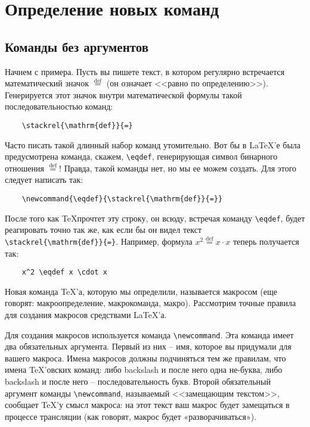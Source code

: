 \chapter{Определение новых команд}
\section{Команды без аргументов}

Начнем с примера. Пусть вы пишете текст, в котором регулярно встречается математический значок $\stackrel{\mathrm{def}}{=}$ (он означает <<равно по определению>>). Генерируется этот значок внутри математической формулы такой последовательностью команд:

\begin{verbatim}
	\stackrel{\mathrm{def}}{=}
\end{verbatim}

Часто писать такой длинный набор команд утомительно. Вот бы в \LaTeX’е была предусмотрена команда, скажем, \verb"\eqdef", генерирующая символ бинарного отношения $\stackrel{\mathrm{def}}{=}$! Правда, такой команды нет, но мы ее можем создать. Для этого следует написать так:

\begin{verbatim}
	\newcommand{\eqdef}{\stackrel{\mathrm{def}}{=}}
\end{verbatim}

\newcommand{\eqdef}{\stackrel{\mathrm{def}}{=}}

После того как \TeX прочтет эту строку, он всюду, встречая команду \verb"\eqdef", будет реагировать точно так же, как если бы он видел текст\\
\verb"\stackrel{\mathrm{def}}{=}". Например, формула $x^2 \eqdef x \cdot x$ теперь получается так:

\begin{verbatim}
	x^2 \eqdef x \cdot x
\end{verbatim}

Новая команда \TeX’а, которую мы определили, называется макросом (еще говорят: макроопределение, макрокоманда, макро). Рассмотрим точные правила для создания макросов средствами \LaTeX’а.

Для создания макросов используется команда \verb"\newcommand". Эта команда имеет два обязательных аргумента. Первый из них -- имя, которое вы придумали для вашего макроса. Имена макросов должны подчиняться тем же правилам, что имена \TeX’овских команд: либо backslash и после него одна не-буква, либо backslash и после него -- последовательность букв. Второй обязательный аргумент команды \verb"\newcommand", называемый <<замещающим текстом>>, сообщает \TeX’у смысл макроса: на этот текст ваш макрос будет замещаться в процессе трансляции (как говорят, макрос будет «разворачиваться»).

